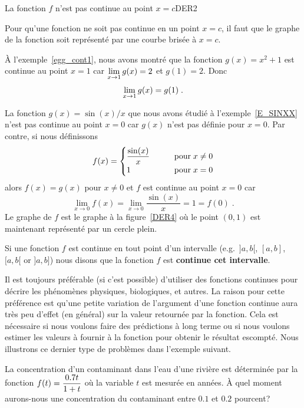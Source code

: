 {
{La fonction $f$ n'est pas continue au point $x=c$}{DER2}

Pour qu'une fonction ne soit pas continue en un point $x=c$, il faut
que le graphe de la fonction soit représenté par une courbe brisée à
$x=c$.

\begin{egg}
À l'exemple~\ref{egg_cont1}, nous avons montré que la fonction
$g(x) = x^2+1$ est continue au point $x=1$ car
$\displaystyle \lim_{x\rightarrow 1} g(x) = 2$ et $g(1)=2$. 
Donc
\[
\displaystyle \lim_{x\rightarrow 1} g(x) = g(1) \; .
\]
\end{egg}

\begin{egg}
La fonction $g(x) = \sin(x)/x$ que nous avons étudié à
l'exemple~\ref{E_SINXX} n'est pas continue au point $x=0$ car $g(x)$
n'est pas définie pour $x=0$. Par contre, si nous définissons
\[
f(x) = \begin{cases}
\displaystyle \frac{\sin(x)}{x} & \qquad \text{pour} \; x\neq 0 \\
1 & \qquad \text{pour} \; x = 0
\end{cases}
\]
alors $f(x) = g(x)$ pour $x\neq 0$ et $f$ est continue au point $x=0$
car
\[
\lim_{x \rightarrow 0} f(x) = \lim_{x\rightarrow 0} \frac{\sin(x)}{x}
= 1 = f(0) \; .
\]
Le graphe de $f$ est le graphe à la figure~\ref{DER4} où le point
$(0,1)$ est maintenant représenté par un cercle plein.
\end{egg}

\begin{defn} 
Si une fonction $f$ est continue en tout point d'un intervalle
(e.g.\ $]a,b[$, $[a,b]$, $[a,b[$ or $]a,b]$) nous disons que la fonction
$f$ est {\bfseries continue cet intervalle}.
\end{defn}

Il est toujours préférable (si c'est possible) d'utiliser des
fonctions continues pour décrire les phénomènes physiques,
biologiques, et autres.  La raison pour cette préférence est qu'une
petite variation de l'argument d'une fonction continue aura très peu
d'effet (en général) sur la valeur retournée par la fonction.  Cela
est nécessaire si nous voulons faire des prédictions à long terme ou si
nous voulons estimer les valeurs à fournir à la fonction pour obtenir le
résultat escompté.  Nous illustrons ce dernier type de problèmes dans
l'exemple suivant.

\begin{egg}[\life]
La concentration d'un contaminant dans l'eau d'une rivière est
déterminée par la fonction
$\displaystyle f(t) = \frac{0.7 t}{1+t}$ où la variable $t$ est mesurée
en années.  À quel moment aurons-nous une concentration du contaminant
entre $0.1$ et $0.2$ pourcent?


\end{egg}}
